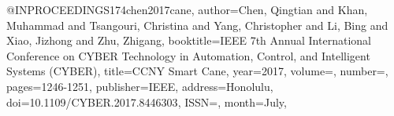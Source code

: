 @INPROCEEDINGS{174chen2017cane,
author={Chen, Qingtian and Khan, Muhammad and Tsangouri, Christina and Yang, Christopher and Li, Bing and Xiao, Jizhong and Zhu, Zhigang},
booktitle={IEEE 7th Annual International Conference on CYBER Technology in Automation, Control, and Intelligent Systems (CYBER)}, 
title={CCNY Smart Cane}, 
year={2017},
volume={},
number={},
pages={1246-1251},
publisher={IEEE},
address={Honolulu},
doi={10.1109/CYBER.2017.8446303},
ISSN={},
month={July},}
